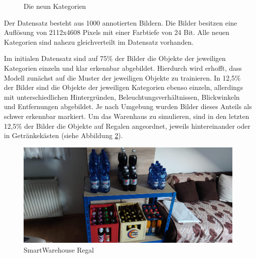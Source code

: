 \begin{figure}[htb]
	\caption{Die neun Kategorien}
	\label{categories}
\end{figure}

Der Datensatz besteht aus 1000 annotierten Bildern. Die Bilder besitzen eine Auflösung von 2112x4608 Pixels mit einer Farbtiefe von 24 Bit. Alle neuen Kategorien sind nahezu gleichverteilt im Datensatz vorhanden. 

Im initialen Datensatz sind auf 75\% der Bilder die Objekte der jeweiligen Kategorien einzeln und klar erkennbar abgebildet. Hierdurch wird erhofft, dass Modell zunächst auf die Muster der jeweiligen Objekte zu trainieren. In 12,5\% der Bilder sind die Objekte der jeweiligen Kategorien ebenso einzeln, allerdings mit unterschiedlichen Hintergründen, Beleuchtungsverhältnissen, Blickwinkeln und Entfernungen abgebildet. Je nach Umgebung wurden Bilder dieses Anteils als schwer erkennbar markiert. Um das Warenhaus zu simulieren, sind in den letzten 12,5\% der Bilder die Objekte auf Regalen angeordnet, jeweils hintereinander oder in Getränkekästen (siehe Abbildung \ref{regal}). 

\begin{figure}[ht]
	\begin{center}
		\includegraphics[width=16cm]{Bilder/regal.jpg} 
		\caption[SmartWarehouse Regal]{SmartWarehouse Regal}
		\label{regal}
	\end{center}
\end{figure}
